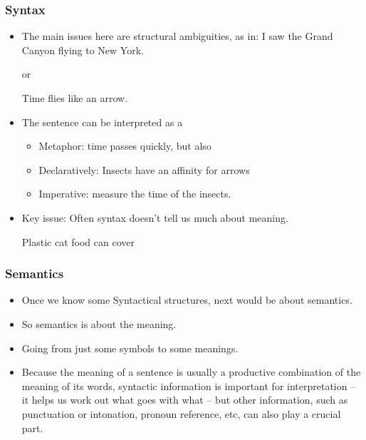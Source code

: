  
\begin{frame}[fragile]
  \frametitle{Syntax}
  \begin{itemize}
  \item The main issues here are structural ambiguities, as in:
                        I saw the Grand Canyon flying to New York.
						
or 

                        Time flies like an arrow. 
						
  \item The sentence can be interpreted as a 
  \begin{itemize}
  \item Metaphor: time passes quickly, but also 
  \item Declaratively: Insects have an affinity for arrows 
  \item Imperative: measure the time of the insects. 
    	  \end{itemize}

  \item Key issue: Often syntax doesn't tell us much about meaning. 
  
                          Plastic cat food can cover

  	  \end{itemize}
 \end{frame} 
 
\begin{frame}[fragile]
  \frametitle{Semantics}
  \begin{itemize}
  \item  Once we know some Syntactical structures, next would be about semantics. 
  \item So semantics is about the meaning. 
  \item Going from just some symbols to some meanings.
  \item Because the meaning of a sentence is usually a productive combination of
the meaning of its words, syntactic information is important for interpretation
– it helps us work out what goes with what – but other information, such as
punctuation or intonation, pronoun reference, etc, can also play a crucial part.
  	  \end{itemize}
 \end{frame} 
 
